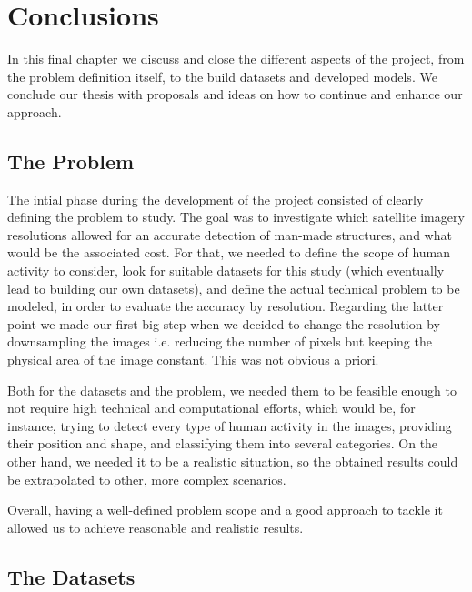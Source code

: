 
\chapter{Conclusions}

\label{Chapter6}


In this final chapter we discuss and close the different aspects of the project, from the problem definition itself, to the build datasets and developed models. We conclude our thesis with proposals and ideas on how to continue and enhance our approach.

\section{The Problem}

The intial phase during the development of the project consisted of clearly defining the problem to study. The goal was to investigate which satellite imagery resolutions allowed for an accurate detection of man-made structures, and what would be the associated cost. For that, we needed to define the scope of human activity to consider, look for suitable datasets for this study (which eventually lead to building our own datasets), and define the actual technical problem to be modeled, in order to evaluate the accuracy by resolution. Regarding the latter point we made our first big step when we decided to change the resolution by downsampling the images i.e. reducing the number of pixels but keeping the physical area of the image constant. This was not obvious a priori.

Both for the datasets and the problem, we needed them to be feasible enough to not require high technical and computational efforts, which would be, for instance, trying to detect every type of human activity in the images, providing their position and shape, and classifying them into several categories. On the other hand, we needed it to be a realistic situation, so the obtained results could be extrapolated to other, more complex scenarios.

Overall, having a well-defined problem scope and a good approach to tackle it allowed us to achieve reasonable and realistic results.

\section{The Datasets}

